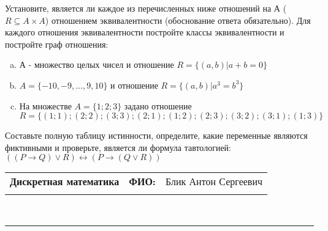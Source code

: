 \documentclass[10pt]{exam}
\newcommand{\class}{Дискретная математика}
\newcommand{\examdate}{}
\begin{document}
\begin{questions}
\question
Установите, является ли каждое из перечисленных ниже отношений на А ($R \subseteq A \times A$) отношением эквивалентности (обоснование ответа обязательно). Для каждого отношения эквивалентности 
постройте классы эквивалентности и постройте граф отношения:
\begin{enumerate}[a)]\setcounter{enumi}{0}
\item А - множество целых чисел и отношение $R = \{(a,b)|a + b = 0\}$
\item $A = \{-10, -9, …, 9, 10\}$ и отношение $R = \{(a,b)|a^{3} = b^{3}\}$
\item На множестве $A = \{1; 2; 3\}$ задано отношение $R = \{(1; 1); (2; 2); (3; 3); (2; 1); (1; 2); (2; 3); (3; 2); (3; 1); (1; 3)\}$

\end{enumerate}\question Составьте полную таблицу истинности, определите, какие переменные являются фиктивными и проверьте, является ли формула тавтологией:
$((P \rightarrow Q) \lor R) \leftrightarrow (P \rightarrow (Q \lor R))$

\end{questions}
\newpage
\begin{flushright}
\begin{tabular}{p{2.8in} r l}
\textbf{\class} & \textbf{ФИО:} &Блик Антон Сергеевич
\\

\textbf{\examdate} &&\\
\end{tabular}\\
\end{flushright}
\rule[1ex]{\textwidth}{.1pt}
\end{document}
